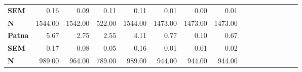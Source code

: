 \begin{tabular}{@{\extracolsep{5pt}}lrrrrrrrrrrrrrrr}
{\bf SEM} & 0.16\phantom{***} & 0.09\phantom{***} & 0.11\phantom{***} & 0.11\phantom{***} & 0.01\phantom{***} & 0.00\phantom{***} & 0.01\phantom{***} \\
{\bf N} & 1544.00\phantom{***} & 1542.00\phantom{***} & 522.00\phantom{***} & 1544.00\phantom{***} & 1473.00\phantom{***} & 1473.00\phantom{***} & 1473.00\phantom{***} \\
{\bf Patna} & 5.67\phantom{***} & 2.75\phantom{***} & 2.55\phantom{***} & 4.11\phantom{***} & 0.77\phantom{***} & 0.10\phantom{***} & 0.67\phantom{***} \\
{\bf SEM} & 0.17\phantom{***} & 0.08\phantom{***} & 0.05\phantom{***} & 0.16\phantom{***} & 0.01\phantom{***} & 0.01\phantom{***} & 0.02\phantom{***} \\
{\bf N} & 989.00\phantom{***} & 964.00\phantom{***} & 789.00\phantom{***} & 989.00\phantom{***} & 944.00\phantom{***} & 944.00\phantom{***} & 944.00\phantom{***} \\
\hline
\end{tabular}
